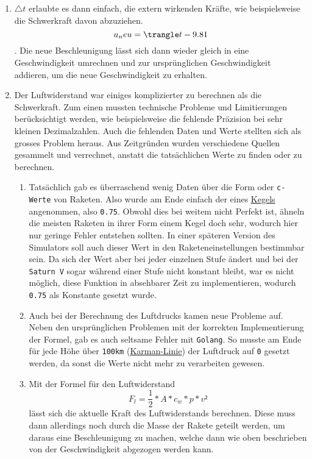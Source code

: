 \documentclass[11pt]{article}
\begin{document}
\begin{enumerate}
\item \(\triangle t\) erlaubte es dann einfach, die extern wirkenden Kräfte, wie
beispielsweise die Schwerkraft davon abzuziehen. \[a_neu = \trangle t -
   9.81\]. Die neue Beschleunigung lässt sich dann wieder gleich in eine
Geschwindigkeit umrechnen und zur ursprünglichen Geschwindigkeit addieren, um
die neue Geschwindigkeit zu erhalten.
\item Der Luftwiderstand war einiges komplizierter zu berechnen als die
Schwerkraft. Zum einen mussten technische Probleme und Limitierungen
berücksichtigt werden, wie beispielsweise die fehlende Präzision bei sehr
kleinen Dezimalzahlen. Auch die fehlenden Daten und Werte stellten sich als
grosses Problem heraus. Aus Zeitgründen wurden verschiedene Quellen gesammelt
und verrechnet, anstatt die tatsächlichen Werte zu finden oder zu berechnen.
\begin{enumerate}
\item Tatsächlich gab es überraschend wenig Daten über die Form oder \texttt{c-Werte} von
Raketen. Also wurde am Ende einfach der eines \href{http://www.staedtisches-gymnasium-wermelskirchen.de/sites/default/files/physik/Fall-Papierkegel-mit-Luftwiderstand.pdf}{Kegels} angenommen, also
\texttt{0.75}. Obwohl dies bei weitem nicht Perfekt ist, ähneln die meisten Raketen
in ihrer Form einem Kegel doch sehr, wodurch hier nur geringe Fehler
entstehen sollten. In einer späteren Version des Simulators soll auch
dieser Wert in den Raketeneinstellungen bestimmbar sein. Da sich der Wert
aber bei jeder einzelnen Stufe ändert und bei der \texttt{Saturn V} sogar während
einer Stufe nicht konstant bleibt, war es nicht möglich, diese Funktion in
absehbarer Zeit zu implementieren, wodurch \texttt{0.75} als Konstante gesetzt
wurde.
\item Auch bei der Berechnung des Luftdrucks kamen neue Probleme auf. Neben den
ursprünglichen Problemen mit der korrekten Implementierung der Formel, gab
es auch seltsame Fehler mit \texttt{Golang}. So musste am Ende für jede Höhe über
\texttt{100km} (\href{https://de.wikipedia.org/wiki/K\%C3\%A1rm\%C3\%A1n-Linie}{Karman-Linie}) der Luftdruck auf \texttt{0} gesetzt werden, da sonst die
Werte nicht mehr zu verarbeiten gewesen.
\item Mit der Formel für den Luftwiderstand
\[F_l = \frac{1}{2} * A * c_w * p * v²\]
lässt sich die aktuelle Kraft des Luftwiderstands berechnen. Diese muss
dann allerdings noch durch die Masse der Rakete geteilt werden, um daraus
eine Beschleunigung zu machen, welche dann wie oben beschrieben von der
Geschwindigkeit abgezogen werden kann.
\end{enumerate}
\end{enumerate}
\end{document}
